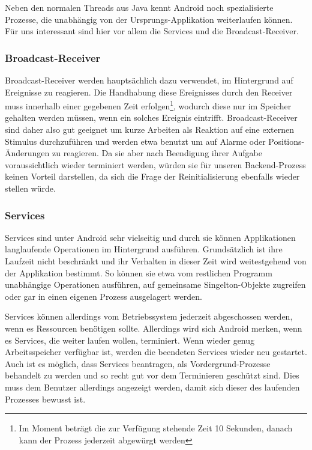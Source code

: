 Neben den normalen Threads aus Java kennt Android noch spezialisierte Prozesse, die unabhängig von der Ursprungs-Applikation weiterlaufen können. Für uns interessant sind hier vor allem die Services und die Broadcast-Receiver.

\subsubsection{Broadcast-Receiver}

Broadcast-Receiver werden hauptsächlich dazu verwendet, im Hintergrund auf Ereignisse zu reagieren. Die Handhabung diese Ereignisses durch den Receiver muss innerhalb einer gegebenen Zeit erfolgen\footnote{Im Moment beträgt die zur Verfügung stehende Zeit 10 Sekunden, danach kann der Prozess jederzeit abgewürgt werden\cite{adbmt}}, wodurch diese nur im Speicher gehalten werden müssen, wenn ein solches Ereignis eintrifft. Broadcast-Receiver sind daher also gut geeignet um kurze Arbeiten als Reaktion auf eine externen Stimulus durchzuführen und werden etwa benutzt um auf Alarme oder Positions-Änderungen zu reagieren. Da sie aber nach Beendigung ihrer Aufgabe voraussichtlich wieder terminiert werden, würden sie für unseren Backend-Prozess keinen Vorteil darstellen, da sich die Frage der Reinitialisierung ebenfalls wieder stellen würde.

\subsubsection{Services}

Services sind unter Android sehr vielseitig und durch sie können Applikationen langlaufende Operationen im Hintergrund ausführen. Grundsätzlich ist ihre Laufzeit nicht beschränkt und ihr Verhalten in dieser Zeit wird weitestgehend von der Applikation bestimmt. So können sie etwa vom restlichen Programm unabhängige Operationen ausführen, auf gemeinsame Singelton-Objekte zugreifen oder gar in einen eigenen Prozess ausgelagert werden.

Services können allerdings vom Betriebssystem jederzeit abgeschossen werden, wenn es Ressourcen benötigen sollte. Allerdings wird sich Android merken, wenn es Services, die weiter laufen wollen, terminiert. Wenn wieder genug Arbeitsspeicher verfügbar ist, werden die beendeten Services wieder neu gestartet. Auch ist es möglich, dass Services beantragen, als Vordergrund-Prozesse behandelt zu werden und so recht gut vor dem Terminieren geschützt sind. Dies muss dem Benutzer allerdings angezeigt werden, damit sich dieser des laufenden Prozesses bewusst ist.

